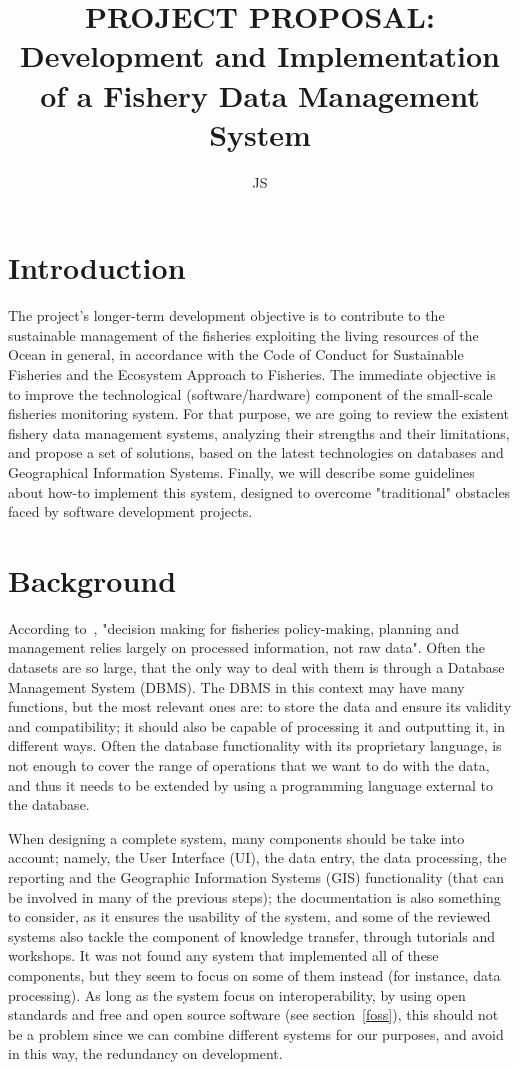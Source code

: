 \documentclass[11pt]{article} %
\title{PROJECT PROPOSAL:\\ Development and Implementation of a Fishery Data Management System}
\author{JS}
\begin{document}
\maketitle

\tableofcontents

\section{Introduction}\label{Introduction}
The project’s longer-term development objective is to contribute to the sustainable management of the fisheries exploiting the living resources of the Ocean in general, in accordance with the Code of Conduct for Sustainable Fisheries and the Ecosystem Approach to Fisheries.
The immediate objective is to improve the technological (software/hardware) component of the small-scale fisheries monitoring system. For that purpose, we are going to review the existent fishery data management systems, analyzing their strengths and their limitations, and propose a set of solutions, based on the latest technologies on databases and Geographical Information Systems. Finally, we will describe some guidelines about how-to implement this system, designed to overcome "traditional" obstacles faced by software development projects.

\section{Background}\label{background}
According to~\cite{fao1}, "decision making for fisheries policy-making, planning and management relies largely on processed information, not raw data". Often the datasets are so large, that the only way to deal with them is through a Database Management System (DBMS). The DBMS in this context may have many functions, but the most relevant ones are: to store the data and ensure its validity and compatibility; it should also be capable of processing it and outputting it, in different ways. Often the database functionality with its proprietary language, is not enough to cover the range of operations that we want to do with the data, and thus it needs to be extended by using a programming language external to the database.

When designing a complete system, many components should be take into account; namely, the User Interface (UI), the data entry, the data processing, the reporting and the Geographic Information Systems (GIS) functionality (that can be involved in many of the previous steps); the documentation is also something to consider, as it ensures the usability of the system, and some of the reviewed systems also tackle the component of knowledge transfer, through tutorials and workshops. It was not found any system that implemented all of these components, but they seem to focus on some of them instead (for instance,  data processing). As long as the system focus on interoperability, by using open standards and free and open source software (see section~\ref{foss}), this should not be a problem since we can combine different systems for our purposes, and avoid in this way, the redundancy on development.
\end{document}
